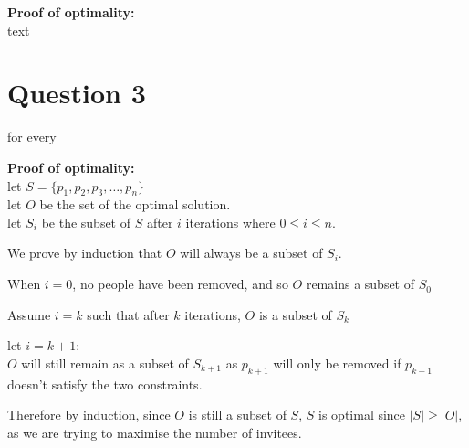 \documentclass{article}
\begin{document}
\textbf{Proof of optimality:}\\
text

\section*{Question 3}
for every

\textbf{Proof of optimality:}\\
let $S = \{p_1, p_2, p_3, \ldots, p_n\}$\\
let $O$ be the set of the optimal solution.\\
let $S_i$ be the subset of $S$ after $i$ iterations where $0 \leq i \leq n$.

We prove by induction that $O$ will always be a subset of $S_i$.

When $i = 0$, no people have been removed, and so $O$ remains a subset of $S_0$

Assume $i = k$ such that after $k$ iterations, $O$ is a subset of $S_k$

let $i = k + 1$:\\
$O$ will still remain as a subset of $S_{k+1}$ as $p_{k+1}$ will only be removed if $p_{k+1}$ doesn't satisfy the two constraints.

Therefore by induction, since $O$ is still a subset of $S$, $S$ is optimal since $|S| \geq |O|$, as we are trying to maximise the number of invitees.
\end{document}
